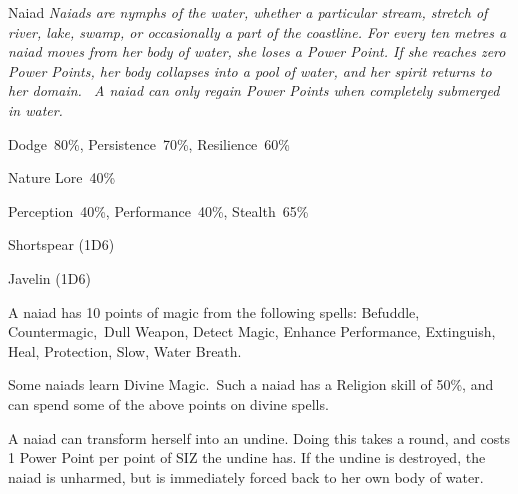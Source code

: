 \begin{monsterbox}{Naiad}
	\textit{Naiads are nymphs of the water, whether a particular stream, stretch of river, lake, swamp, or occasionally a part of the coastline. For every ten metres a naiad moves from her body of water, she loses a Power Point. If she reaches zero Power Points, her body collapses into a pool of water, and her spirit returns to her domain.  A naiad can only regain Power Points when completely submerged in water.}\\
	\rpghline
	\basics[%
        hitpoints  = 10, 
	majorwound = 5,
	damagemodifier = 0,
	powerpoints = 25,
	movementrate = 15m,
	armor = None,
	plunderrating = 1
	]
	\rpghline%
	\stats[ %
		STR = 4D6    (14),
		CON = 3D6    (11),
		DEX = 4D6    (14),
		SIZ = 2D6+3  (10),
		INT = 3D6+6  (17),
		POW = 2D6+18 (25),
		CHA = 2D6+12 (19)
	]
	\rpghline%
	\begin{rpg-monsteraction}[Resistances]
		Dodge~80\%, Persistence~70\%, Resilience~60\%
	\end{rpg-monsteraction}
	\begin{rpg-monsteraction}[Knowledge]
		Nature Lore~40\%
	\end{rpg-monsteraction}
	\begin{rpg-monsteraction}[Practical]
		Perception~40\%, Performance~40\%, Stealth~65\%
	\end{rpg-monsteraction}
	\begin{rpg-monsteraction}
		Shortspear (1D6)
	\end{rpg-monsteraction}
	\begin{rpg-monsteraction}
		Javelin (1D6)
	\end{rpg-monsteraction}
	\begin{rpg-monsteraction}[Magic 60\%]
		A naiad has 10 points of magic from the following spells: Befuddle, Countermagic, Dull Weapon, Detect Magic, Enhance Performance, Extinguish, Heal, Protection, Slow, Water Breath.
	\end{rpg-monsteraction}
	\begin{rpg-monsteraction}
		Some naiads learn Divine Magic. Such a naiad has a Religion skill of 50\%, and can spend some of the above points on divine spells.
	\end{rpg-monsteraction}
	\begin{rpg-monsteraction}
		A naiad can transform herself into an undine. Doing this takes a round, and costs 1 Power Point per point of SIZ the undine has. If the undine is destroyed, the naiad is unharmed, but is immediately forced back to her own body of water.
	\end{rpg-monsteraction}

\end{monsterbox}

